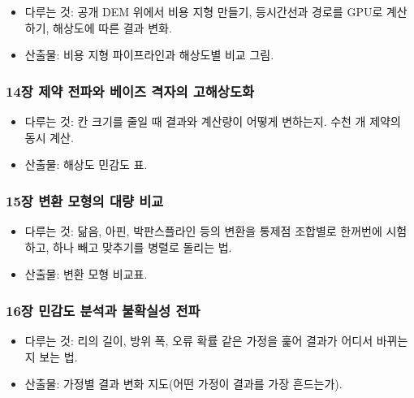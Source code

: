 \documentclass[10pt,a4paper]{article}
\providecommand{\tightlist}{\setlength{\itemsep}{0pt}\setlength{\parskip}{0pt}}
\begin{document}
\begin{itemize}
\tightlist
\item
  다루는 것: 공개 DEM 위에서 비용 지형 만들기, 등시간선과 경로를 GPU로 계산하기, 해상도에 따른 결과 변화.
\item
  산출물: 비용 지형 파이프라인과 해상도별 비교 그림.
\end{itemize}

\hypertarget{uxc7a5-uxc81cuxc57d-uxc804uxd30cuxc640-uxbca0uxc774uxc988-uxaca9uxc790uxc758-uxace0uxd574uxc0c1uxb3c4uxd654}{%
\subsubsection{14장 제약 전파와 베이즈 격자의 고해상도화}\label{uxc7a5-uxc81cuxc57d-uxc804uxd30cuxc640-uxbca0uxc774uxc988-uxaca9uxc790uxc758-uxace0uxd574uxc0c1uxb3c4uxd654}}

\begin{itemize}
\tightlist
\item
  다루는 것: 칸 크기를 줄일 때 결과와 계산량이 어떻게 변하는지. 수천 개 제약의 동시 계산.
\item
  산출물: 해상도 민감도 표.
\end{itemize}

\hypertarget{uxc7a5-uxbcc0uxd658-uxbaa8uxd615uxc758-uxb300uxb7c9-uxbe44uxad50}{%
\subsubsection{15장 변환 모형의 대량 비교}\label{uxc7a5-uxbcc0uxd658-uxbaa8uxd615uxc758-uxb300uxb7c9-uxbe44uxad50}}

\begin{itemize}
\tightlist
\item
  다루는 것: 닮음, 아핀, 박판스플라인 등의 변환을 통제점 조합별로 한꺼번에 시험하고, 하나 빼고 맞추기를 병렬로 돌리는 법.
\item
  산출물: 변환 모형 비교표.
\end{itemize}

\hypertarget{uxc7a5-uxbbfcuxac10uxb3c4-uxbd84uxc11duxacfc-uxbd88uxd655uxc2e4uxc131-uxc804uxd30c}{%
\subsubsection{16장 민감도 분석과 불확실성 전파}\label{uxc7a5-uxbbfcuxac10uxb3c4-uxbd84uxc11duxacfc-uxbd88uxd655uxc2e4uxc131-uxc804uxd30c}}

\begin{itemize}
\tightlist
\item
  다루는 것: 리의 길이, 방위 폭, 오류 확률 같은 가정을 훑어 결과가 어디서 바뀌는지 보는 법.
\item
  산출물: 가정별 결과 변화 지도(어떤 가정이 결과를 가장 흔드는가).
\end{itemize}
\end{document}
